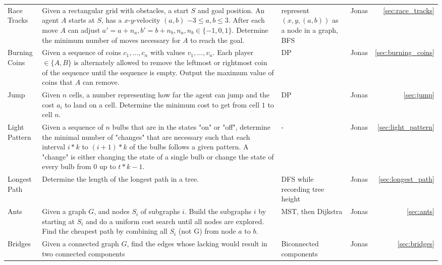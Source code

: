\documentclass[a4paper, 10pt]{article}
\begin{document}
\begin{longtable}{ p{2cm} p{7cm} p{3cm} r r}
        Race Tracks 
        & Given a rectangular grid with obstacles, a start $S$ and goal position. An agent $A$ starts at $S$, has a $x$-$y$-velocity $(a,b)$ 
            $-3\leq a,b \leq3$. After each move $A$ can adjust $a'=a+n_a, b'=b+n_b, n_a,n_b \in \{-1,0,1\}$. 
            Determine the minimum number of moves necessary for $A$ to reach the goal. 
        & represent $(x,y,(a,b))$ as a node in a graph, BFS & Jonas & \ref{sec:race_tracks} \\

        Burning Coins 
        & Given a sequence of coins $c_1, \dots, c_n$ with values $v_1,\dots,v_n$. 
            Each player $\in \{A,B\}$ is alternately allowed to remove the leftmost or rightmost coin of the sequence until the sequence is empty. 
            Output the maximum value of coins that $A$ can remove. 
        & DP & Jonas & \ref{sec:burning_coins} \\

        Jump 
        & Given $n$ cells, a number representing how far the agent can jump and the cost $a_i$ to land on a cell. 
            Determine the minimum cost to get from cell $1$ to cell $n$.        
        & DP & Jonas & \ref{sec:jump} \\

        Light Pattern 
        & Given a sequence of $n$ bulbs that are in the states "on" or "off", determine the minimal number of "changes" that are necessary such that  
            each interval $i*k$ to $(i+1)*k$ of the bulbs follows a given pattern. A "change" is either changing the state of a single bulb or
            change the state of every  bulb from $0$ up to $t*k-1$.
        & - & Jonas & \ref{sec:light_pattern} \\

        Longest Path 
        & Determine the length of the longest path in a tree.
        & DFS while recording tree height & Jonas & \ref{sec:longest_path} \\

        Ants 
        & Given a graph $G$, and nodes $S_i$ of subgraphs $i$. 
            Build the subgraphs $i$ by starting at $S_i$ and do a uniform cost search until all nodes are explored.
            Find the cheapest path by combining all $S_i$ (not G) from node $a$ to $b$. 
        & MST, then Dijkstra & Jonas & \ref{sec:ants} \\

        Bridges 
        & Given a connected graph $G$, find the edges whose lacking would result in two connected components         
        & Biconnected components & Jonas & \ref{sec:bridges} \\


\end{longtable}
\end{document}
